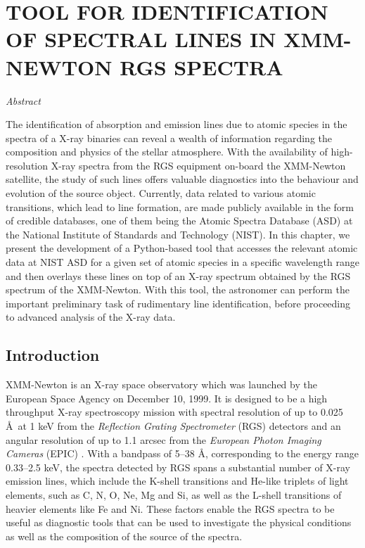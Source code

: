 \chapter{TOOL FOR IDENTIFICATION OF SPECTRAL LINES IN XMM-NEWTON RGS SPECTRA} \label{chap:tool}
    \minitoc
    
    \newpage
    \begin{center}
    	\emph{Abstract}
    \end{center}
    The identification of absorption and emission lines due to atomic species in the spectra of a X-ray binaries can reveal a wealth of information regarding the composition and physics of the stellar atmosphere. With the availability of high-resolution X-ray spectra from the RGS equipment on-board the XMM-Newton satellite, the study of such lines offers valuable diagnostics into the behaviour and evolution of the source object. Currently, data related to various atomic transitions, which lead to line formation, are made publicly available in the form of credible databases, one of them being the Atomic Spectra Database (ASD) at the National Institute of Standards and Technology (NIST). In this chapter, we present the development of a Python-based tool that accesses the relevant atomic data at NIST ASD for a given set of atomic species in a specific wavelength range and then overlays these lines on top of an X-ray spectrum obtained by the RGS spectrum of the XMM-Newton. With this tool, the astronomer can perform the important preliminary task of rudimentary line identification, before proceeding to advanced analysis of the X-ray data.
    
    \newpage
    \section{Introduction} \label{tool:intro}
    	XMM-Newton is an X-ray space observatory which was launched by the European Space Agency on December 10, 1999. It is designed to be a high throughput X-ray spectroscopy mission with spectral resolution of up to 0.025 \AA\ at 1 keV from the \textit{Reflection Grating Spectrometer} (RGS) detectors and an angular resolution of up to 1.1 arcsec from the \textit{European Photon Imaging Cameras} (EPIC) \cite{ehle2003xmm,jansen2001xmm}. With a bandpass of 5--38 \AA, corresponding to the energy range 0.33--2.5 keV, the spectra detected by RGS spans a substantial number of X-ray emission lines, which include the K-shell transitions and He-like triplets of light elements, such as C, N, O, Ne, Mg and Si, as well as the L-shell transitions of heavier elements like Fe and Ni. These factors enable the RGS spectra to be useful as diagnostic tools that can be used to investigate the physical conditions as well as the composition of the source of the spectra.
    
